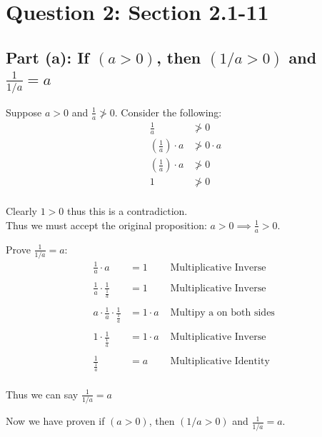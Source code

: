\documentclass[11pt]{article}
\theoremstyle{plain}
\begin{document}
\section*{Question 2: Section 2.1-11}
\subsection*{Part (a): If $(a>0)$, then $(1/a>0)$ and $\frac{1}{1/a} = a$}
Suppose $a>0$ and $\frac{1}{a} \not > 0$. Consider the following:
\[
	\begin{aligned}
		\frac{1}{a}           & \not > 0         \\
		(\frac{1}{a}) \cdot a & \not > 0 \cdot a \\
		(\frac{1}{a}) \cdot a & \not > 0         \\
		1                     & \not > 0         \\
	\end{aligned}
\]
\begin{center}
	Clearly $1>0$ thus this is a contradiction. \\
	Thus we must accept the original proposition: $a>0 \implies \frac{1}{a}>0$.
\end{center}
Prove $\frac{1}{1/a}=a$:
\[
	\begin{aligned}
		\frac{1}{a} \cdot a                             & = 1         & \text{ Multiplicative Inverse }  \\ \\
		\frac{1}{a} \cdot \frac{1}{\frac{1}{a}}         & = 1         & \text{ Multiplicative Inverse }  \\ \\
		a \cdot \frac{1}{a} \cdot \frac{1}{\frac{1}{a}} & = 1 \cdot a & \text{ Multipy a on both sides } \\ \\
		1 \cdot \frac{1}{\frac{1}{a}}                   & = 1 \cdot a & \text{ Multiplicative Inverse  } \\ \\
		\frac{1}{\frac{1}{a}}                           & = a         & \text{ Multiplicative Identity } \\
	\end{aligned}
\]
\begin{center}
	Thus we can say $\frac{1}{1/a}=a$
\end{center}
Now we have proven if $(a>0)$, then $(1/a>0)$ and $\frac{1}{1/a} = a$.
\end{document}
